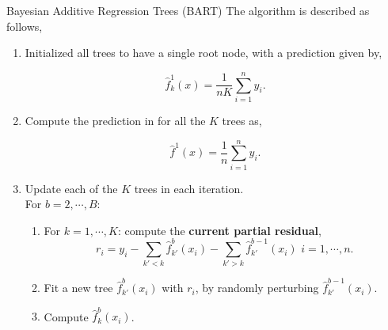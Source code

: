 \begin{frame}{Bayesian Additive Regression Trees (BART)}
    The algorithm is described as follows, \pause 

    \begin{enumerate}
        \item Initialized all trees to have a single root node, with a prediction given by, \pause 

        \begin{equation*}
            \hat{f}_k^1(x) = \frac{1}{nK} \sum_{i=1}^n y_i.
        \end{equation*} \pause 

        \item Compute the prediction in for all the $K$ trees as,  \pause 

        \begin{equation*}
            \hat{f}^1(x) = \frac{1}{n} \sum_{i=1}^n y_i.
        \end{equation*} \pause 

        \item Update each of the $K$ trees in each iteration. \\ \pause 
        For $b = 2, \cdots, B:$  \pause 
        \begin{enumerate}[a]
            \item For $k = 1, \cdots , K$: compute the \textbf{current partial residual}, \pause 
            \begin{equation*}
                r_i = y_i - \sum_{k' < k} \hat{f}_{k'}^b (x_i) - \sum_{k'>k} \hat{f}^{b-1}_{k'}(x_i) \, \, i = 1, \cdots, n.
            \end{equation*} \pause 
            \item Fit a new tree $\hat{f}_{k'}^b (x_i)$ with $r_i$, by randomly perturbing $\hat{f}^{b-1}_{k'}(x_i)$. \pause 
            \item Compute $\hat{f}_{k}^b (x_i)$. 
        \end{enumerate}
            
    \end{enumerate}
    
\end{frame}

